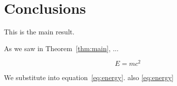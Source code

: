 \chapter{Conclusions} \label{ch:conclusions} 

\begin{theorem}\label{thm:main}
This is the main result.
\end{theorem}

As we saw in Theorem~\ref{thm:main}, ...


\begin{equation}\label{eq:energy}
E = mc^2
\end{equation}

We substitute into equation~\eqref{eq:energy}. also \ref{eq:energy}



